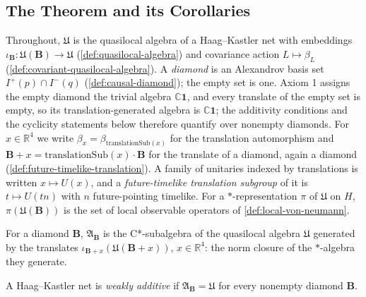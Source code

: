 \subsection{The Theorem and its Corollaries}

Throughout, $\mathfrak{U}$ is the quasilocal algebra of a Haag--Kastler net with embeddings $\iota_{\mathbf{B}} : \mathfrak{U}(\mathbf{B}) \to \mathfrak{U}$ (\ref{def:quasilocal-algebra}) and covariance action $L \mapsto \beta_L$ (\ref{def:covariant-quasilocal-algebra}). A \emph{diamond} is an Alexandrov basis set $I^+(p) \cap I^-(q)$ (\ref{def:causal-diamond}); the empty set is one. Axiom 1 assigns the empty diamond the trivial algebra $\mathbb{C}\mathbf{1}$, and every translate of the empty set is empty, so its translation-generated algebra is $\mathbb{C}\mathbf{1}$; the additivity conditions and the cyclicity statements below therefore quantify over nonempty diamonds. For $x \in \mathbb{R}^4$ we write $\beta_x = \beta_{\mathrm{translationSub}(x)}$ for the translation automorphism and $\mathbf{B} + x = \mathrm{translationSub}(x) \cdot \mathbf{B}$ for the translate of a diamond, again a diamond (\ref{def:future-timelike-translation}). A family of unitaries indexed by translations is written $x \mapsto U(x)$, and a \emph{future-timelike translation subgroup} of it is $t \mapsto U(tn)$ with $n$ future-pointing timelike. For a $*$-representation $\pi$ of $\mathfrak{U}$ on $H$, $\pi(\mathfrak{U}(\mathbf{B}))$ is the set of local observable operators of \ref{def:local-von-neumann}.

\begin{definition}
    \label{def:translation-generated-algebra}
    \leanok
    For a diamond $\mathbf{B}$, $\mathfrak{A}_{\mathbf{B}}$ is the C*-subalgebra of the quasilocal algebra $\mathfrak{U}$ generated by the translates $\iota_{\mathbf{B}+x}(\mathfrak{U}(\mathbf{B}+x))$, $x \in \mathbb{R}^4$: the norm closure of the $*$-algebra they generate.
\end{definition}

\begin{definition}
    \label{def:weak-additivity}
    \leanok
    A Haag--Kastler net is \emph{weakly additive} if $\mathfrak{A}_{\mathbf{B}} = \mathfrak{U}$ for every nonempty diamond $\mathbf{B}$.
\end{definition}

